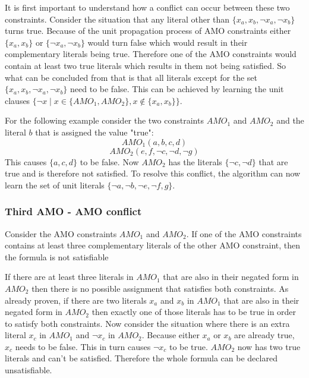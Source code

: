 It is first important to understand how a conflict can occur between these two constraints. Consider the situation that any literal other than $\{x_a, x_b, \neg x_a, \neg x_b\}$ turns true. Because of the unit propagation process of AMO constraints either $\{x_a, x_b\}$ or $\{\neg x_a, \neg x_b\}$ would turn false which would result in their complementary literals being true. Therefore one of the AMO constraints would contain at least two true literals which results in them not being satisfied. So what can be concluded from that is that all literals except for the set $\{x_a, x_b, \neg x_a, \neg x_b\}$ need to be false. This can be achieved by learning the unit clauses $\{\neg x \; | \; x \in \{AMO_1,AMO_2\}, x \notin \{x_a,x_b\}\}$.

For the following example consider the two constraints $AMO_1$ and $AMO_2$ and the literal $b$ that is assigned the value "true":
\begin{displaymath}
AMO_1(a,b,c,d)
\end{displaymath}
\begin{displaymath}
AMO_2(e,f,\neg c,\neg d, \neg g)
\end{displaymath}
This causes $\{a,c,d\}$ to be false. Now $AMO_2$ has the literals $\{\neg c,\neg d\}$ that are true and is therefore not satisfied. To resolve this conflict, the algorithm can now learn the set of unit literals $\{\neg a, \neg b, \neg e, \neg f, g\}$.

\subsubsection{Third AMO - AMO conflict}

\begin{leftbar}
Consider the AMO constraints $AMO_1$ and $AMO_2$. If one of the AMO constraints contains at least three complementary literals of the other AMO constraint, then the formula is not satisfiable
\end{leftbar}

If there are at least three literals in $AMO_1$ that are also in their negated form in $AMO_2$ then there is no possible assignment that satisfies both constraints. As already proven, if there are two literals $x_a$ and $x_b$ in $AMO_1$ that are also in their negated form in $AMO_2$ then exactly one of those literals has to be true in order to satisfy both constraints. Now consider the situation where there is an extra literal $x_c$ in $AMO_1$ and $\neg x_c$ in $AMO_2$. Because either $x_a$ or $x_b$ are already true, $x_c$ needs to be false. This in turn causes $\neg x_c$ to be true. $AMO_2$ now has two true literals and can't be satisfied. Therefore the whole formula can be declared unsatisfiable.

